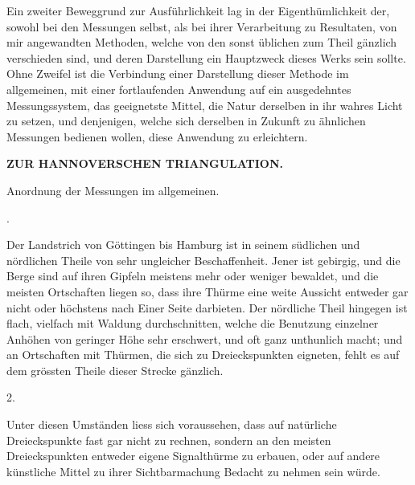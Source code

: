 \par\noindent\hspace*{\parindent}Ein zweiter Beweggrund zur Ausführlichkeit lag in der Eigenthümlichkeit
der, sowohl bei den Messungen selbst, als bei ihrer Verarbeitung zu
Resultaten, von mir angewandten Methoden, welche von den sonst üblichen
zum Theil gänzlich verschieden sind, und deren Darstellung ein Hauptzweck
dieses Werks sein sollte. Ohne Zweifel ist die Verbindung einer Darstellung
dieser Methode im allgemeinen, mit einer fortlaufenden Anwendung auf ein
ausgedehntes Messungssystem, das geeignetste Mittel, die Natur derselben in
ihr wahres Licht zu setzen, und denjenigen, welche sich derselben in Zukunft
zu ähnlichen Messungen bedienen wollen, diese Anwendung zu erleichtern.
\par\clearpage

\noindent\null\hfill{\small\textbf{ZUR HANNOVERSCHEN TRIANGULATION.}}\hfill{}\par\medskip
\begin{center}
\par\smallskip
Anordnung der Messungen im allgemeinen.\par{}.
\end{center}

\par\noindent\hspace*{\parindent}Der Landstrich von Göttingen bis Hamburg ist in seinem südlichen und
nördlichen Theile von sehr ungleicher Beschaffenheit. Jener ist gebirgig, und
die Berge sind auf ihren Gipfeln meistens mehr oder weniger bewaldet, und
die meisten Ortschaften liegen so, dass ihre Thürme eine weite Aussicht entweder
gar nicht oder höchstens nach Einer Seite darbieten. Der nördliche
Theil hingegen ist flach, vielfach mit Waldung durchschnitten, welche die
Benutzung einzelner Anhöhen von geringer Höhe sehr erschwert, und oft
ganz unthunlich macht; und an Ortschaften mit Thürmen, die sich zu Dreieckspunkten
eigneten, fehlt es auf dem grössten Theile dieser Strecke gänzlich.

\begin{center}
2.
\end{center}

\par\noindent\hspace*{\parindent}Unter diesen Umständen liess sich voraussehen, dass auf natürliche Dreieckspunkte
fast gar nicht zu rechnen, sondern an den meisten Dreieckspunkten
entweder eigene Signalthürme zu erbauen, oder auf andere künstliche Mittel
zu ihrer Sichtbarmachung Bedacht zu nehmen sein würde.

